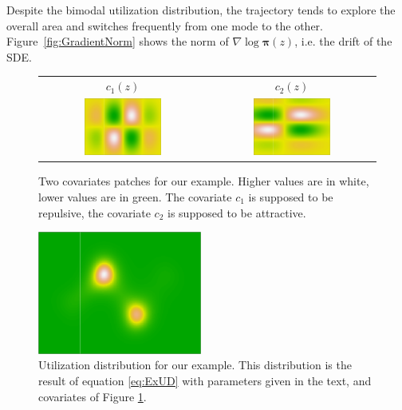 \documentclass[10pt,a4paper, draft]{article}
\newcommand{\ud}{\boldsymbol{\pi}}
\begin{document}
Despite the bimodal utilization distribution, the trajectory tends to explore the overall area and switches frequently from one mode to the other. Figure~\ref{fig:GradientNorm} shows the norm of $\nabla \log \ud(z)$, i.e. the drift of the SDE.
\begin{figure}
\centering
\begin{tabular}{cc}
$c_1(z)$ & $c_2(z)$\\
\includegraphics[width = 0.48\textwidth]{figures/Covariate1}&
\includegraphics[width = 0.48\textwidth]{figures/Covariate2}
\end{tabular}
\caption{\label{fig:Covariates} Two covariates patches for our example. Higher values are in white, lower values are in green. The covariate $c_1$ is supposed to be repulsive, the covariate $c_2$ is supposed to be attractive.}
\end{figure}
\begin{figure}
\centering
\includegraphics[width = 0.48\textwidth]{figures/ResultingUD}
\caption{\label{fig:ResultUD} Utilization distribution for our example. This distribution is the result of equation \eqref{eq:ExUD} with parameters given in the text, and covariates of Figure \ref{fig:Covariates}.}
\end{figure}
\end{document}
